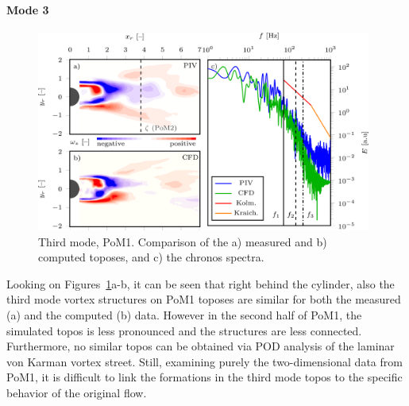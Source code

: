 {\paragraph{Mode 3}
\begin{figure}[htbp]
    \centering
    \includegraphics[width=0.98\textwidth]{02_images/00_export/figure13.png}
    \caption{{Third mode, PoM1.} Comparison of the a) measured and b) computed toposes, and c) the chronos spectra.}
    \label{fig:mod3}
\end{figure}
Looking on Figures~\ref{fig:mod3}a-b, {it can be seen that right behind the cylinder, } also the third mode vortex structures on PoM1 {toposes are} similar for both the measured (a) and the computed (b) data. However in the second half of PoM1, the simulated topos is less pronounced and the structures are less connected. {Furthermore, no similar topos can be obtained via POD analysis of the laminar von Karman vortex street. Still, examining purely the two-dimensional data from PoM1, it is difficult to link the formations in the third mode topos to the specific behavior of the original flow.}


}

